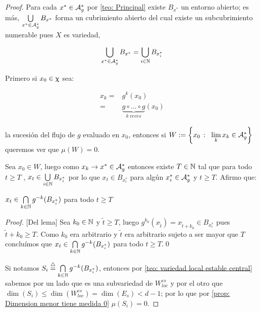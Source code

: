 \begin{proof}
	Para cada $x^* \in \mathcal{A}_{g}^{*}$ por \ref{teo: Principal} existe $B_{x^*}$ un entorno abierto; es m\'as, $\bigcup\limits_{x^* \in \mathcal{A}_{g}^{*}}{B_{x^{*}}}$ forma un cubrimiento abierto del cual existe un subcubrimiento numerable pues $X$ es variedad, \ie
	
	\[
	\bigcup\limits_{x^* \in \mathcal{A}_{g}^{*}}{B_{x^{*}}} = \bigcup\limits_{i \in {\mathbb{N}}}{B_{x^{*}_{i}}}
	\]
	
	Primero si $x_0 \in \upchi$ sea:
	
	\begin{equation*}
	\begin{aligned}
	x_k = & g^k(x_0) \\
	= & \underbrace{g \circ \dots \circ g }_{k \ veces} (x_0)
	\end{aligned}
	\end{equation*}
	
	la sucesi\'on del flujo de $g$ evaluado en $x_0$, entonces si $W := \sett{x_0 \ \colon \ \Biglim{k}{x_k \in \mathcal{A}_g^{*}}}$ queremos ver que $\mu(W) = 0$.
	
	Sea $x_0 \in W$, luego como $x_k \rightarrow x^* \in \mathcal{A}_{g}^{*}$ entonces existe $T \in {\mathbb{N}}$ tal que para todo $t \ge T$ , $x_t \in  \bigcup\limits_{i \in {\mathbb{N}}}{B_{x^{*}_{i}}}$ por lo que $x_t \in B_{x^{*}_{i}}$ para alg\'un $x_{i}^{*} \in \mathcal{A}_{g}^{*}$ y $t \ge T$. Afirmo que:
	
	\begin{lemma}
		\label{lemma: teo_principal}
		$x_t \in \bigcap\limits_{k \in {\mathbb{N}}}{g^{-k}(B_{x_{i}^{*}})}$ para todo $t \ge T$
	\end{lemma}

	\begin{proof}{[Del lema]}
		Sea $k_0 \in {\mathbb{N}}$ y $\widetilde{t} \geq T$, luego $g^{k_0}\left(x_{\widetilde{t}}\right) = x_{\widetilde{t} + k_0} \in B_{x_{i}^{*}}$ pues $\widetilde{t} + k_0 \geq T$. Como $k_0$ era arbitrario y $\widetilde{t}$ era arbitrario sujeto a ser mayor que $T$ conclu\'imos que $x_t \in \bigcap\limits_{k \in {\mathbb{N}}}{g^{-k}(B_{x_{i}^{*}})}$ para todo $t \ge T$.\qed
	\end{proof}
	
	Si notamos $S_i \stackrel{\triangle}{=} \bigcap\limits_{k \in {\mathbb{N}}}{g^{-k}(B_{x_{i}^{*}})}$, entonces por \ref{teo: variedad local estable central} sabemos por un lado que es una subvariedad de $W_{loc}^{cs}$ y por el otro que $\dim(S_i) \le \dim(W_{loc}^{cs}) = \dim(E_s) < d-1$; por lo que por \ref{prop: Dimension menor tiene medida 0} $\mu(S_i) = 0$.
	

\end{proof}
